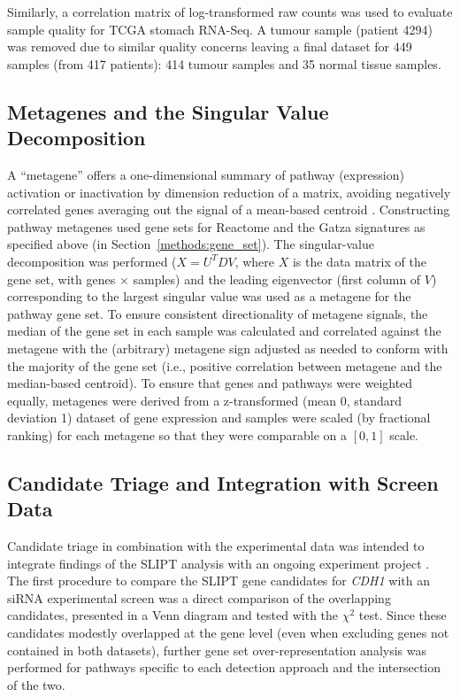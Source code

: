 Similarly, a correlation matrix of log-transformed raw counts was used to evaluate sample quality for \gls{TCGA} stomach \gls{RNA-Seq}. A tumour sample (patient 4294) was removed due to similar quality concerns leaving a final dataset for 449 samples (from 417 patients): 414 tumour samples and 35 normal tissue samples.

\subsection{Metagenes and the Singular Value Decomposition} \label{methods:metagene}
A ``\gls{metagene}'' offers a one-dimensional summary of \gls{pathway} (expression) activation or inactivation by dimension reduction of a matrix, avoiding negatively correlated genes averaging out the signal of a mean-based centroid \citep{Huang2003}. Constructing \gls{pathway} \glspl{metagene} used gene sets for Reactome and the Gatza signatures \citep{Gatza2011, Gatza2014} as specified above (in Section~\ref{methods:gene_set}). The singular-value decomposition was performed ($X = U^{T} D V$, where $X$ is the data matrix of the gene set, with genes $\times$ samples) and the leading eigenvector (first column of $V$) corresponding to the largest singular value was used as a \gls{metagene} for the \gls{pathway} gene set. To ensure consistent directionality of \gls{metagene} signals, the median of the gene set in each sample was calculated and correlated against the \gls{metagene} with the (arbitrary) \gls{metagene} sign adjusted as needed to conform with the majority of the gene set (i.e., positive correlation between \gls{metagene} and the median-based centroid). To ensure that genes and \glspl{pathway} were weighted equally, \glspl{metagene} were derived from a z-transformed (mean 0, standard deviation 1) dataset of \gls{gene expression} and samples were scaled (by fractional ranking) for each \gls{metagene} so that they were comparable on a $[0,1]$ scale. 

\subsection{Candidate Triage and Integration with Screen Data} \label{methods:venn_analysis}
Candidate triage in combination with the experimental data was intended to integrate findings of the \gls{SLIPT} analysis with an ongoing experiment project \citep{Chen2014, Telford2015}. The first procedure to compare the \gls{SLIPT} gene candidates for \textit{CDH1} with an \gls{siRNA} experimental screen \citep{Telford2015} was a direct comparison of the overlapping candidates, presented in a Venn diagram and tested with the $\chi^2$ test. Since these candidates modestly overlapped at the gene level (even when excluding genes not contained in both datasets), further gene set over-representation analysis was performed for pathways specific to each detection approach and the intersection of the two.

